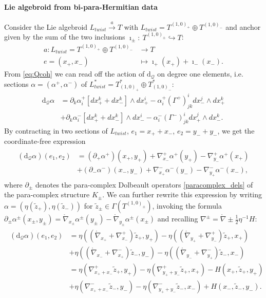 \documentclass[letterpaper,12pt]{article}
\newcommand{\QQ}{\mathcal{Q}}
\newcommand{\lc}{\mathring{\n}}
\newcommand{\ap}{\alpha}
\def\w{\wedge}
\newcommand{\p}{\partial}
\newcommand{\n}{\nabla}
\newcommand{\rd}{\mathrm{d}}
\newcommand{\se}{\Gamma}
\newcommand{\zt}{\tl{z}}
\def\tl{\tilde}
\theoremstyle{definition}
\theoremstyle{remark}
\theoremstyle{examples}
\begin{document}
\paragraph{Lie algebroid from bi-para-Hermitian data} 
Consider the Lie algebroid $L_{twist}\overset{a}{\rightarrow} T$ with $L_{twist}=T^{(1,0)_+}\oplus T^{(1,0)_-}$ and anchor given by the sum of the two inclusions $\imath_\pm:\ T^{(1,0)_\pm}\hookrightarrow T$:
\begin{align*}
a:L_{twist}=T^{(1,0)_+}\oplus T^{(1,0)_-} &\rightarrow T\\
 e=(x_+,x_-) &\mapsto \imath_+(x_+)+\imath_-(x_-).
\end{align*}
From \eqref{eq:Qcoh} we can read off the action of $\rd_\QQ$ on degree one elements, i.e. sections $\alpha=(\alpha^+,\alpha^-)$ of $L^*_{twist}=T^*_{(1,0)_+}\oplus T^*_{(1,0)_-}$:
\begin{align*}
\rd_\QQ\alpha&=\p_k\ap_i^+[dx_+^k+dx_-^k]\w dx_+^i-\ap^+_i(\Gamma^+)^i_{jk}dx_-^j\w dx_+^k\\
&+\p_k\ap_i^-[dx_+^k+dx_-^k]\w dx_-^i-\ap^-_i(\Gamma^-)^i_{jk}dx_+^j\w dx_-^k.
\end{align*}
By contracting in two sections of $L_{twist}$, $e_1=x_++x_-$, $e_2=y_-+y_-$, we get the coordinate-free expression
\begin{align}\label{eq:dQ}
\begin{aligned}
(\rd_\QQ\ap)(e_1,e_2)&=(\p_+\ap^+)(x_+,y_+)+\n^+_{x_-}\ap^+(y_+)-\n^+_{y_-}\ap^+(x_+)\\
&+(\p_-\ap^-)(x_-,y_-)+\n^-_{x_+}\ap^-(y_-)-\n^-_{y_+}\ap^-(x_-),
\end{aligned}
\end{align}
where $\p_\pm$ denotes the para-complex Dolbeault operators \eqref{paracomplex_dels} of the para-complex structure $K_\pm$. We can further rewrite this expression by writing $\ap=(\eta(\tl{z}_+),\eta(\tl{z}_-))$ for $\tl{z}_\pm \in \se(T^{(1,0)_\pm})$, invoking the formula $\p_\pm\ap^\pm(x_\pm,y_\pm)=\lc_{x_\pm}\ap^\pm(y_\pm)-\lc_{y_\pm}\ap^\pm(x_\pm)$ and recalling $\n^\pm=\lc\pm \frac{1}{2}\eta^{-1}H$:
\begin{align}
\begin{aligned}
(\rd_\QQ\ap)(e_1,e_2)&=\eta((\lc_{x_+}+\n_{x_-}^+)\zt_+,y_+)-\eta((\lc_{y_+}+\n_{y_-}^+)\zt_+,x_+)\\
&+\eta((\lc_{x_-}+\n_{x_+}^-)\zt_-,y_-)-\eta((\lc_{y_-}+\n_{y_+}^-)\zt_-,x_-)\\
&=\eta(\n^+_{x_++x_-}\zt_+,y_+)-\eta(\n_{y_++y_-}^+\zt_+,x_+)-H(x_+,\zt_+,y_+)\\
&+\eta(\n_{x_++x_-}^-\zt_-,y_-)-\eta(\n_{y_++y_-}^-\zt_-,x_-)+H(x_-,\zt_-,y_-).
\end{aligned}
\end{align}
\end{document}
